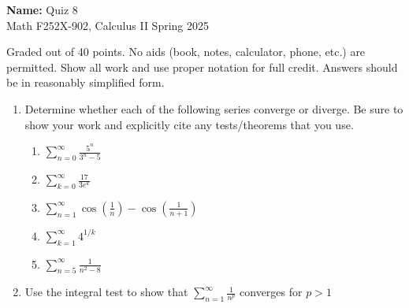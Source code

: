 \documentclass[12pt]{article}
\newcommand{\ds}{\displaystyle}
\begin{document}
\pagestyle{plain}

\noindent \textbf{Name:} \underline{\hspace{15em}}		\hfill	Quiz 8 \\
           Math F252X-902, Calculus II  			\hfill	Spring 2025 	

                \vspace{1cm}
                
Graded out of 40 points. No aids (book, notes,
calculator, phone, etc.) are permitted. Show all work and use proper
notation for full credit. Answers should be in reasonably simplified
form.
\vspace{0.3cm}

\begin{enumerate}
\item  Determine whether each of the following series converge or
  diverge. Be sure to show your work and explicitly cite any
  tests/theorems that you use.

  \begin{enumerate}
  \item $\ds \sum_{n=0}^{\infty} \frac{5^n}{3^n - 5}$
    \vfill
    
  \item $\ds \sum_{k=0}^{\infty} \frac{17}{3e^k}$
    \vfill
    
  \item $\ds \sum_{n=1}^{\infty} \cos\left(\frac{1}{n}\right) - \cos\left(\frac{1}{n+1}\right)$
    \vfill
    
      \newpage

  \item $\ds \sum_{k=1}^{\infty} 4^{1/k}$
    \vfill
    
  \item $\ds \sum_{n=5}^{\infty} \frac{1}{n^2 - 8}$
    \vfill
    
  \end{enumerate}


  \item Use the integral test to show that $\ds \sum_{n=1}^{\infty} \frac{1}{n^p}$ converges for $p > 1$
    \vfill
  
  
\end{enumerate}
\end{document}

